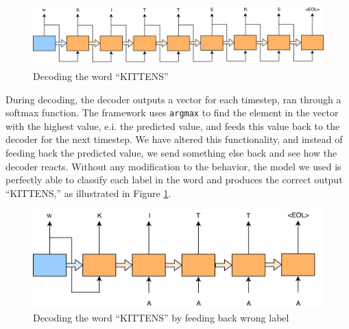 \begin{figure}[ht]
    \centering
    \includegraphics[width=1\textwidth]{fig/results/kittens_correct.png}
    \caption{Decoding the word ``KITTENS''}
    \label{fig:kittens_correct}
\end{figure}

During decoding, the decoder outputs a vector for each timestep, ran through a softmax function. The framework uses {\tt argmax} to find the element in the vector with the highest value, e.i. the predicted value, and feeds this value back to the decoder for the next timestep. We have altered this functionality, and instead of feeding back the predicted value, we send something else back and see how the decoder reacts. Without any modification to the behavior, the model we used is perfectly able to classify each label in the word and produces the correct output ``KITTENS,'' as illustrated in Figure \ref{fig:kittens_correct}. 

\begin{figure}[ht]
    \centering
    \includegraphics[width=1\textwidth]{fig/results/kittens_wrong.png}
    \caption{Decoding the word ``KITTENS'' by feeding back wrong label}
    \label{fig:kittens_wrong}
\end{figure}

